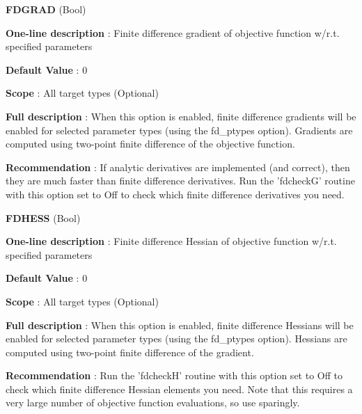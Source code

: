 \begin{DoxyItemize}
\item {\bfseries  \-F\-D\-G\-R\-A\-D } (\-Bool) \par
{\bfseries  \-One-\/line description }\-: \-Finite difference gradient of objective function w/r.\-t. specified parameters \par
{\bfseries  \-Default \-Value }\-: 0 \par
{\bfseries  \-Scope }\-: \-All target types (\-Optional) \par
{\bfseries  \-Full description }\-: \-When this option is enabled, finite difference gradients will be enabled for selected parameter types (using the fd\-\_\-ptypes option). \-Gradients are computed using two-\/point finite difference of the objective function. \par
{\bfseries  \-Recommendation }\-: \-If analytic derivatives are implemented (and correct), then they are much faster than finite difference derivatives. \-Run the 'fdcheck\-G' routine with this option set to \-Off to check which finite difference derivatives you need.\end{DoxyItemize}
\begin{DoxyItemize}
\item {\bfseries  \-F\-D\-H\-E\-S\-S } (\-Bool) \par
{\bfseries  \-One-\/line description }\-: \-Finite difference \-Hessian of objective function w/r.\-t. specified parameters \par
{\bfseries  \-Default \-Value }\-: 0 \par
{\bfseries  \-Scope }\-: \-All target types (\-Optional) \par
{\bfseries  \-Full description }\-: \-When this option is enabled, finite difference \-Hessians will be enabled for selected parameter types (using the fd\-\_\-ptypes option). \-Hessians are computed using two-\/point finite difference of the gradient. \par
{\bfseries  \-Recommendation }\-: \-Run the 'fdcheck\-H' routine with this option set to \-Off to check which finite difference \-Hessian elements you need. \-Note that this requires a very large number of objective function evaluations, so use sparingly.\end{DoxyItemize}
